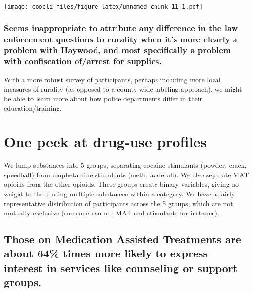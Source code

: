 \documentclass[
]{book}
\begin{document}
\texttt{[image: coocli\_files/figure-latex/unnamed-chunk-11-1.pdf]}

\hypertarget{seems-inappropriate-to-attribute-any-difference-in-the-law-enforcement-questions-to-rurality-when-its-more-clearly-a-problem-with-haywood-and-most-specifically-a-problem-with-confiscation-ofarrest-for-supplies.}{%
\subsection{Seems inappropriate to attribute any difference in the law enforcement questions to rurality when it's more clearly a problem with Haywood, and most specifically a problem with confiscation of/arrest for supplies.}\label{seems-inappropriate-to-attribute-any-difference-in-the-law-enforcement-questions-to-rurality-when-its-more-clearly-a-problem-with-haywood-and-most-specifically-a-problem-with-confiscation-ofarrest-for-supplies.}}

With a more robust survey of participants, perhaps including more local measures of rurality (as opposed to a county-wide labeling approach), we might be able to learn more about how police departments differ in their education/training.

\hypertarget{one-peek-at-drug-use-profiles}{%
\chapter{One peek at drug-use profiles}\label{one-peek-at-drug-use-profiles}}

We lump substances into 5 groups, separating cocaine stimulants (powder, crack, speedball) from amphetamine stimulants (meth, adderall). We also separate MAT opioids from the other opioids. These groups create binary variables, giving no weight to those using multiple substances within a category. We have a fairly representative distribution of participants across the 5 groups, which are not mutually exclusive (someone can use MAT and stimulants for instance).

\hypertarget{those-on-medication-assisted-treatments-are-about-64-times-more-likely-to-express-interest-in-services-like-counseling-or-support-groups.}{%
\section{Those on Medication Assisted Treatments are about 64\% times more likely to express interest in services like counseling or support groups.}\label{those-on-medication-assisted-treatments-are-about-64-times-more-likely-to-express-interest-in-services-like-counseling-or-support-groups.}}
\end{document}
